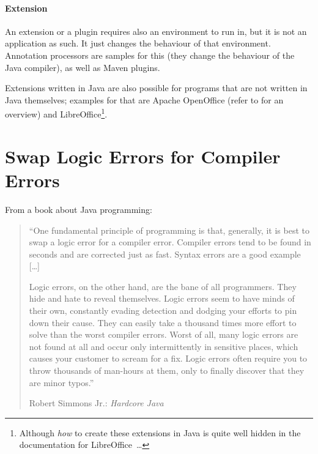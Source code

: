 \documentclass[11pt,a4paper, titlepage, parskip=half, headsepline, footsepline, cleardoublepage=current, headheight=1cm]{scrbook}
\begin{document}

\paragraph{Extension}\label{sec:Extension}
An extension or a plugin requires also an environment to run in, but it is not an application as such. It just changes the behaviour of that environment. Annotation processors are samples for this (they change the behaviour of the Java compiler), as well as Maven\autocite{APACHE_MAVEN} plugins.

Extensions written in Java are also possible for programs that are not written in Java themselves; examples for that are Apache OpenOffice\autocite{APACHE_OPENOFFICE} (refer to \autocite{APACHE_OPENOFFICE:ExtensionsInJava} for an overview) and LibreOffice\autocite{LIBREOFFICE}\footnote{Although \textit{how} to create these extensions in Java is quite well hidden in the documentation for LibreOffice~…}.


\section{Swap Logic Errors for Compiler Errors}\label{sec:SwapToCompilerErrors}
From a book about Java programming:
\begin{quote}
“One fundamental principle of programming is that, generally, it is best to swap a logic error for a compiler error. Compiler errors tend to be found in seconds and are corrected just as fast. Syntax errors are a good example […]

Logic errors, on the other hand, are the bane of all programmers. They hide and hate to reveal themselves. Logic errors seem to have minds of their own, constantly evading detection and dodging your efforts to pin down their cause. They can easily take a thousand times more effort to solve than the worst compiler errors. Worst of all, many logic errors are not found at all and occur only intermittently in sensitive places, which causes your customer to scream for a fix. Logic errors often require you to throw thousands of man-hours at them, only to finally discover that they are minor typos.”

Robert Simmons Jr.: \textit{Hardcore Java}\autocite{Simmons:HARDCORE_JAVA}
\end{quote}
\end{document}
